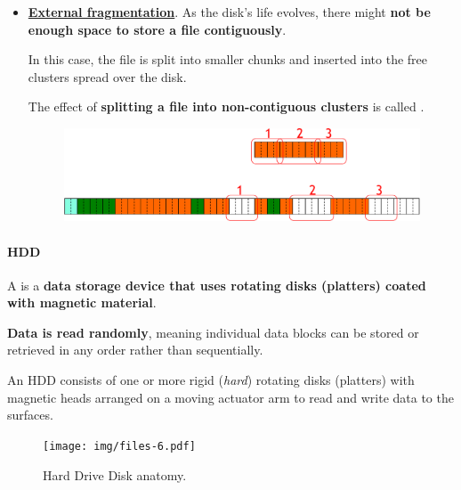 \begin{itemize}
    \item \underline{\textbf{External fragmentation}}. As the disk's life evolves, there might \textbf{not be enough space to store a file contiguously}.
    
    In this case, the file is split into smaller chunks and inserted into the free clusters spread over the disk.
    
    The effect of \textbf{splitting a file into non-contiguous clusters} is called .
    \begin{figure}[!htp]
        \centering
        \includegraphics[width=\textwidth]{img/files-5.pdf}
    \end{figure}
\end{itemize}

\newpage

\paragraph{HDD}\label{paragraph: HDD}

A  is a \textbf{data storage device that uses rotating disks (platters) coated with magnetic material}.

\highspace
\textbf{Data is read randomly}, meaning individual data blocks can be stored or retrieved in any order rather than sequentially.

\highspace
An HDD consists of one or more rigid (\emph{hard}) rotating disks (platters) with magnetic heads arranged on a moving actuator arm to read and write data to the surfaces.

\begin{figure}[!htp]
    \centering
    \texttt{[image: img/files-6.pdf]}
    \caption{Hard Drive Disk anatomy.}
\end{figure}

